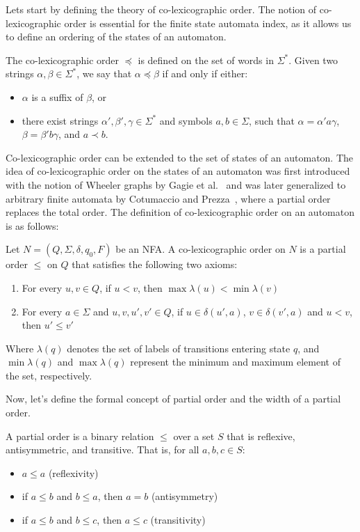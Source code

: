 Lets start by defining the theory of co-lexicographic order. The notion of co-lexicographic order is essential for the finite state automata index, as it allows us to define an ordering of the states of an automaton. 
\begin{definition} 
    The co-lexicographic order $\preceq$ is defined on the set of words in $\Sigma^*$. Given two strings $\alpha, \beta \in \Sigma^*$, we say that $\alpha \preceq \beta$ if and only if either:
    \begin{itemize}[leftmargin=25pt]
        \item $\alpha$ is a suffix of $\beta$, or
        \item there exist strings $\alpha', \beta', \gamma \in \Sigma^*$ and symbols $a, b \in \Sigma$, such that $\alpha = \alpha'a\gamma$, $\beta = \beta'b\gamma$, and $a \prec b$.
    \end{itemize}
\end{definition}
Co-lexicographic order can be extended to the set of states of an automaton. The idea of co-lexicographic order on the states of an automaton was first introduced with the notion of Wheeler graphs by Gagie et al.~\cite{gagie2017wheeler} and was later generalized to arbitrary finite automata by Cotumaccio and Prezza~\cite{cotumaccio2021indexing}, where a partial order replaces the total order. The definition of co-lexicographic order on an automaton is as follows:

\begin{definition} \label{def:colex_order_on_automaton}
    Let $N = (Q, \Sigma, \delta, q_0, F)$ be an NFA. A co-lexicographic order on $N$ is a partial order $\leq$ on $Q$ that satisfies the following two axioms:
    \begin{enumerate}[leftmargin=25pt]
        \item For every $u, v \in Q$, if $u < v$, then $\max\lambda(u) < \min\lambda(v)$
        \item For every $a \in \Sigma$ and $u, v, u', v' \in Q$, if $u \in \delta(u', a)$, $v \in \delta(v', a)$ and $u < v$, then $u' \leq v'$
    \end{enumerate}
\end{definition}
Where $\lambda(q)$ denotes the set of labels of transitions entering state $q$, and $\min\lambda(q)$ and $\max\lambda(q)$ represent the minimum and maximum element of the set, respectively.

Now, let's define the formal concept of partial order and the width of a partial order. 
\begin{definition}
    A partial order is a binary relation $\leq$ over a set $S$ that is reflexive, antisymmetric, and transitive. That is, for all $a, b, c \in S$:
    \begin{itemize}[leftmargin=25pt]
        \item $a \leq a$ (reflexivity)
        \item if $a \leq b$ and $b \leq a$, then $a = b$ (antisymmetry)
        \item if $a \leq b$ and $b \leq c$, then $a \leq c$ (transitivity)
    \end{itemize}
\end{definition}

